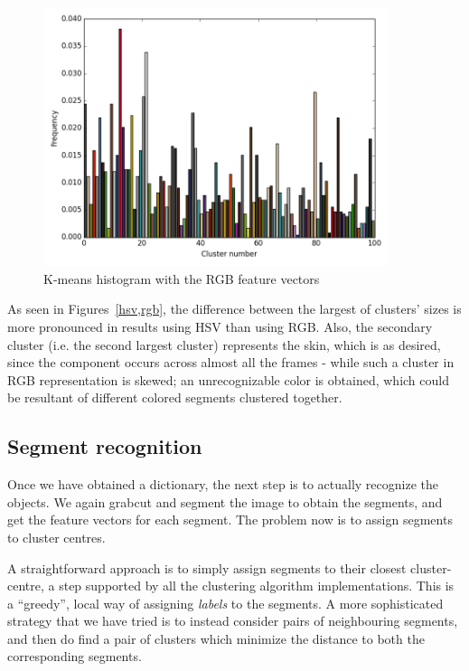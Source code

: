 \documentclass[10pt,twocolumn,letterpaper]{article}
\begin{document}
\begin{figure}[h]
  \centering
  \includegraphics[width=0.9\textwidth]{rgb.png}
  \caption{K-means histogram with the RGB feature vectors}
  \label{rgb}
\end{figure}



As seen in Figures~\ref{hsv,rgb}, the difference between the largest
of clusters’ sizes is more pronounced in results using HSV than using
RGB. Also, the secondary cluster (i.e. the second largest cluster)
represents the skin, which is as desired, since the component occurs
across almost all the frames - while such a cluster in RGB
representation is skewed; an unrecognizable color is obtained, which
could be resultant of different colored segments clustered together.

\subsection{Segment recognition}

Once we have obtained a dictionary, the next step is to actually
recognize the objects. We again grabcut and segment the image to
obtain the segments, and get the feature vectors for each segment. The
problem now is to assign segments to cluster centres.

A straightforward approach is to simply assign segments to their
closest cluster-centre, a step supported by all the clustering
algorithm implementations. This is a ``greedy'', local way of
assigning \emph{labels} to the segments. A more sophisticated strategy
that we have tried is to instead consider pairs of neighbouring
segments, and then do find a pair of clusters which minimize the
distance to both the corresponding segments. 
\end{document}
